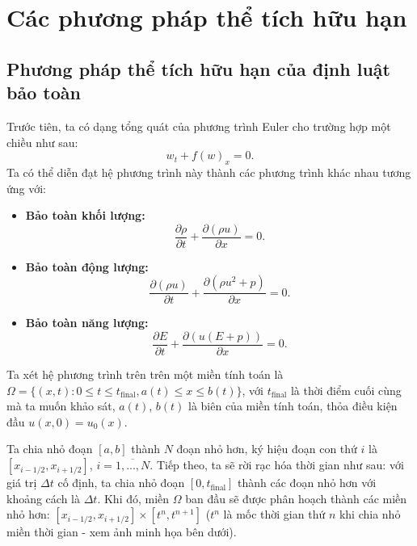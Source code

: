 \section{Các phương pháp thể tích hữu hạn}
\subsection{Phương pháp thể tích hữu hạn của định luật bảo toàn}
Trước tiên, ta có dạng tổng quát của phương trình Euler cho trường hợp một chiều như sau:
\[
w_t + f(w)_x = 0.
\]
Ta có thể diễn đạt hệ phương trình này thành các phương trình khác nhau tương ứng với:
\begin{itemize}
    \item \textbf{Bảo toàn khối lượng:}
    \[
    \dfrac{\partial \rho}{\partial t} + \dfrac{\partial (\rho u)}{\partial x} = 0.
    \]
    \item \textbf{Bảo toàn động lượng:}
    \[
    \dfrac{\partial (\rho u)}{\partial t} + \dfrac{\partial (\rho u^2 + p)}{\partial x} = 0.
    \]
    \item \textbf{Bảo toàn năng lượng:}
    \[
    \dfrac{\partial E}{\partial t} + \dfrac{\partial (u(E + p))}{\partial x} = 0.
    \]
\end{itemize}

Ta xét hệ phương trình trên trên một miền tính toán là $\Omega = \{(x, t) : 0 \leq t \leq t_{\text{final}}, a(t) \leq x \leq b(t) \}$, với $t_{\text{final}}$ là thời điểm cuối cùng mà ta muốn khảo sát, $a(t)$, $b(t)$ là biên của miền tính toán, thỏa điều kiện đầu $u(x, 0) = u_0(x)$.

Ta chia nhỏ đoạn $[a, b]$ thành $N$ đoạn nhỏ hơn, ký hiệu đoạn con thứ $i$ là $[x_{i - 1/2}, x_{i + 1/2}]$, $i = \overline{1, ..., N}$. Tiếp theo, ta sẽ rời rạc hóa thời gian như sau: với giá trị $\Delta t$ cố định, ta chia nhỏ đoạn $[0, t_{\text{final}}]$ thành các đoạn nhỏ hơn với khoảng cách là $\Delta t$. Khi đó, miền $\Omega$ ban đầu sẽ được phân hoạch thành các miền nhỏ hơn: $[x_{i - 1/2}, x_{i + 1/2}] \times [t^n, t^{n+1}]$ ($t^n$ là mốc thời gian thứ $n$ khi chia nhỏ miền thời gian - xem ảnh minh họa bên dưới).


